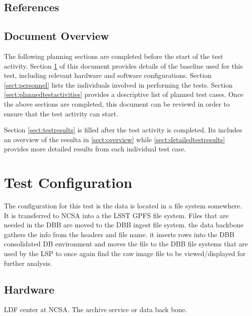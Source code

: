 \documentclass[DM,lsstdraft,STR,toc]{lsstdoc}
\begin{document}
 
\subsection{References}
\label{sect:references}

\renewcommand{\refname}{}


\subsection{Document Overview}
\label{sect:docoverview}

The following planning sections are completed before the start of the test activity.
Section \ref{sect:configuration} of this document provides details of the \product{} baseline used for this test, including relevant hardware and software configurations.
Section \ref{sect:personnel} lists the individuals involved in performing the tests.
Section \ref{sect:plannedtestactivities} provides a descriptive list of planned test cases.
Once the above sections are completed, this document can be reviewd in order to ensure that the test activity can start.

Section \ref{sect:testresults} is filled after the test activity is completed. 
Its includes  an overview of the resulta in \ref{sect:overview}
while \ref{sect:detailedtestresults} provides more detailed results from each individual test case.

\section{Test Configuration}
\label{sect:configuration}

The configuration for this test is the data is located in a file system somewhere.  It is transferred to NCSA into a the LSST GPFS file system.   Files that are needed in the DBB are moved to the DBB ingest file system.   the data backbone gathers the info from the headers and file name.  it inserts rows into the DBB consolidated DB environment and moves the file to the DBB file systems that are used by the LSP to once again find the raw image file to be viewed/displayed for further analysis.  

\subsection{Hardware}
\label{sect:hwconf}

LDF center at NCSA.   The archive service or data back bone.
\end{document}
